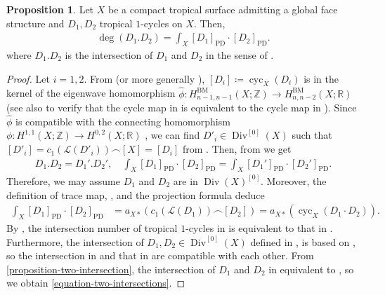 \documentclass[a4paper,dvipdfmx,reqno,12pt]{amsart}
\theoremstyle{definition}
\newtheorem{proposition}[theorem]{Proposition}
\newcommand{\deq}{\coloneqq}
\newcommand{\opn}[1]{\operatorname{#1}}
\newcommand{\PD}[1]{[#1]_{\mathrm{PD}}}
\numberwithin{equation}{section}
\begin{document}
\begin{proposition}
\label{proposition-cycle-chern}
Let $X$ be a compact tropical surface admitting a global face
structure and $D_1,D_2$
tropical $1$-cycles on $X$. Then,
\begin{align}
\label{equation-two-intersections}
\opn{deg}(D_1 .  D_2)=\int_X \PD{D_1}\cdot \PD{D_2}.
\end{align}
where $D_1. D_2$ is the intersection of $D_1$ and $D_2$
in the sense of \cite{shaw2015tropical}.
\end{proposition}
\begin{proof}
Let $i=1,2$.
From \cite[Theorem 5.4]{MR3330789}
(or more generally \cite[Theorem 1.1]{MR3894860}),
$[D_i]\deq\opn{cyc}_X(D_i)$ is in the kernel 
of the eigenwave homomorphism
$\hat{\phi} \colon
H_{n-1,n-1}^{\mathrm{BM}}(X;\mathbb{Z})
\to H_{n,n-2}^{\mathrm{BM}}(X;\mathbb{R})$
(see also \cite[Theorem 5.13]{MR4637248}
to verify that the cycle map
in \cite[Definition 4.13]{MR3894860}
is equivalent to the cycle map in
\cite[Definition 5.4]{MR4637248}).
Since $\hat{\phi}$ is compatible with
the connecting homomorphism
$\phi \colon H^{1,1}(X;\mathbb{Z})
\to H^{0,2}(X;\mathbb{R})$ \cite[Lemma 5.13]{MR3894860},
we can find $D'_i\in \opn{Div}^{[0]}(X)$
such that 
$[D'_i]=c_1(\mathcal{L}(D'_i))\frown [X]=[D_i]$
from \cite[Proposition 5.12]{MR4637248}.
Then, from 
\cite[Proposition 3.34]{shaw2015tropical} we get
\begin{align}
D_1.D_2=D_1'.D_2', \quad 
\int_X \PD{D_1}\cdot \PD{D_2}
=\int_X \PD{D_1'}\cdot \PD{D_2'}.
\end{align}
Therefore, we may assume $D_1$ and $D_2$ are in
$\opn{Div}(X)^{[0]}$.
Moreover, the definition of trace map,
\cite[Proposition 5.12]{MR4637248}, and the projection
formula deduce
\begin{align}
\int_X \PD{D_1}\cdot \PD{D_2}
&=a_{X*}(c_1(\mathcal{L}(D_1))\frown [D_2])
=a_{X*}(\opn{cyc}_X(D_1\cdot D_2)).
\end{align}
By \cite[Theorem 3.1.7]{shaw2011tropical},
the intersection number of tropical $1$-cycles
in \cite{shaw2015tropical} is equivalent to
that in \cite{shaw2011tropical}.
Furthermore, the intersection of
$D_1,D_2\in \opn{Div}^{[0]}(X)$ defined in
\cite[]{demedrano2023chern},
is based on \cite{shaw2011tropical},
so the intersection in 
\cite{demedrano2023chern} and 
that in \cite{shaw2015tropical} are
compatible with each other.
From \cref{proposition-two-intersection},
the intersection of $D_1$ and $D_2$ in
\cite{demedrano2023chern} equivalent to
\cite{MR4637248}, so we obtain
\cref{equation-two-intersections}.
\end{proof}




\end{document}
